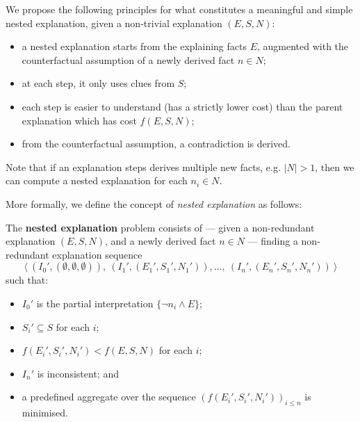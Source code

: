We propose the following principles for what constitutes a meaningful and simple nested explanation, given a non-trivial explanation $(E,S,N)$:
\begin{itemize}
 \item a nested explanation starts from the explaining facts $E$, %
 augmented with the counterfactual assumption of a newly derived fact $n \in N$; 
 \item at each step, it only uses clues from $S$;
 \item each step is easier to understand (has a strictly lower cost) than the parent explanation which has cost $f(E,S,N)$;
 \item from the counterfactual assumption, a contradiction is derived. %
\end{itemize}

Note that if an explanation steps derives multiple new facts, e.g. $|N| > 1$, then we can compute a nested explanation for each $n_i \in N$.

More formally, we define the concept of \emph{nested explanation} as follows:

\begin{definition}\label{def:nested-problem}
The \textbf{nested explanation} problem consists of --- given a non-redundant explanation $(E, S, N)$, and a newly derived fact $n \in N$ --- finding a non-redundant explanation sequence 
    \[\langle \ (I_0',(\emptyset,\emptyset,\emptyset)),\ (I_1',(E_1',S_1',N_1')), \dots ,\ (I_n',(E_n',S_n',N_n')) \ \rangle\]
    such that:
    \begin{itemize}
        \item $I_0'$ is the partial interpretation $\{ \neg n_i \wedge E \}$;
        \item $S_i'\subseteq S$ for each $i$;
        \item $f(E_i',S_i',N_i')< f(E, S, N)$ for each $i$; 
        \item $I_n'$ is inconsistent; and
        \item a predefined aggregate over the sequence $\left(f(E_i',S_i',N_i')\right)_{i\leq n}$ is minimised.
    \end{itemize}
\end{definition}

